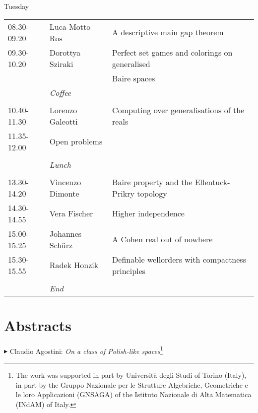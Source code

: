 \documentclass[a4paper]{amsart}
\theoremstyle{remark}
\begin{document}
\bigskip 
\bigskip 

\begin{center} 
Tuesday
\end{center} 

\bigskip 

\begin{tabular} 
{ l l l}
08.30-09.20  & Luca Motto Ros  \hspace{15pt} & A descriptive main gap theorem \\ 
09.30-10.20  & Dorottya Sziraki & Perfect set games and colorings on generalised \\ 
& & Baire spaces \\ 
& \emph{Coffee} \\ 
& & \\ 
10.40-11.30  & Lorenzo Galeotti & Computing over generalisations of the reals \\ 
11.35-12.00  & Open problems & \\ 
& & \\ 
& \emph{Lunch} \\ 
& & \\ 
13.30-14.20  & Vincenzo Dimonte & Baire property and the Ellentuck-Prikry topology \\ 
14.30-14.55  & Vera Fischer & Higher independence \\ 
15.00-15.25  & Johannes Sch\"urz & A Cohen real out of nowhere \\ 
15.30-15.55  & Radek Honzik & Definable wellorders with compactness principles \\ 
& & \\ 
& \emph{End} & \\ 
\end{tabular} 




\newpage 

\section*{Abstracts} 





\bigskip 
\noindent 
$\blacktriangleright$ Claudio Agostini: \emph{On a class of Polish-like spaces}\footnote{The work was supported in part by 
Universit\`a degli Studi of Torino (Italy), in part by the Gruppo Nazionale per le Strutture Algebriche, Geometriche e le loro Applicazioni (GNSAGA) of the Istituto Nazionale di Alta Matematica (INdAM) of Italy.}
\end{document}
